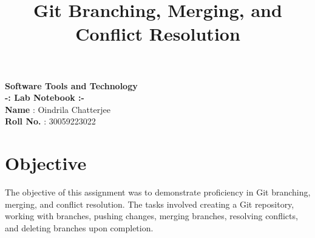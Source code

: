 \documentclass{article}
\begin{document}
\LARGE
    \textbf{{Software Tools and Technology\\
        -: Lab Notebook :-}}
    \vspace{0.5cm}\\
\textbf{Name} : Oindrila Chatterjee\\
\textbf{Roll No.} : 30059223022 



\newpage
\title{Git Branching, Merging, and Conflict Resolution}
\author{}
\date{}


\maketitle

\section*{Objective}
The objective of this assignment was to demonstrate proficiency in Git branching, merging, and conflict resolution. The tasks involved creating a Git repository, working with branches, pushing changes, merging branches, resolving conflicts, and deleting branches upon completion.
\end{document}
